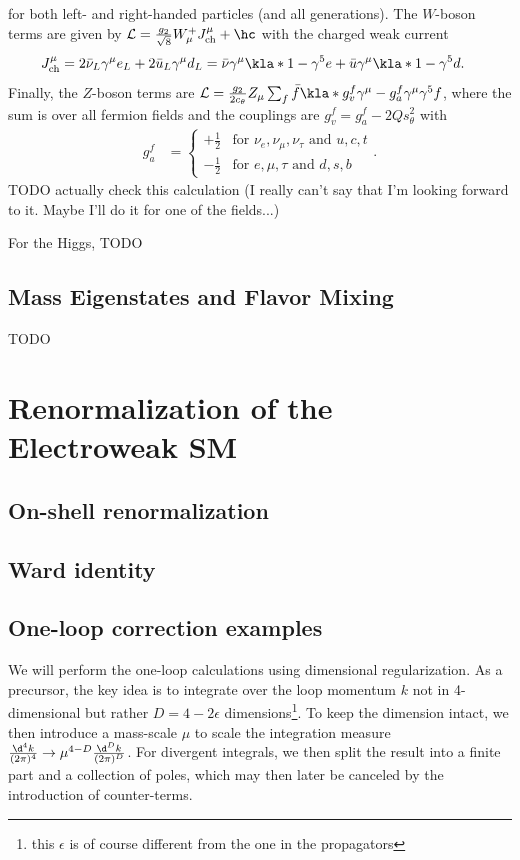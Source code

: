 \documentclass[english, parskip=full]{scrbook}
\begin{document}
for both left- and right-handed particles (and all generations).
The $W$-boson terms are given by $\mathcal{L} = \frac{g_2}{\sqrt{8}} W_\mu^+ J_\text{ch}^\mu + \hc$ with the charged weak current
\begin{align}
J_\text{ch}^\mu &= 2\bar{\nu}_{L} \gamma^\mu e_L + 2\bar{u}_L\gamma^\mu d_L = \bar{\nu} \gamma^\mu \kla*{1-\gamma^5} e + \bar{u} \gamma^\mu \kla*{1-\gamma^5} d.
\end{align}
Finally, the $Z$-boson terms are $\mathcal{L} = \frac{g_2}{2c_\theta} Z_\mu \sum_f \bar{f} \kla*{g^f_v \gamma^\mu - g^f_a \gamma^\mu \gamma^5}f$, where the sum is over all fermion fields and the couplings are $g^f_v = g^f_a - 2Qs_\theta^2$ with
\begin{align}
g^f_a &= \begin{cases} +\frac{1}{2} & \text{for }\nu_e,\nu_\mu,\nu_\tau \text{ and } u,c,t \\ -\frac{1}{2} & \text{for }e,\mu,\tau \text{ and } d,s,b \end{cases}.
\end{align}
TODO actually check this calculation (I really can't say that I'm looking forward to it. Maybe I'll do it for one of the fields...)

For the Higgs, TODO

\section{Mass Eigenstates and Flavor Mixing}
TODO

\chapter{Renormalization of the Electroweak SM}
\section{On-shell renormalization}
\section{Ward identity}
\section{One-loop correction examples}
We will perform the one-loop calculations using dimensional regularization.
As a precursor, the key idea is to integrate over the loop momentum $k$ not in 4-dimensional but rather $D=4-2\epsilon$ dimensions\footnote{this $\epsilon$ is of course different from the one in the propagators}.
To keep the dimension intact, we then introduce a mass-scale $\mu$ to scale the integration measure $\frac{\d^4k}{(2\pi)^4} \rightarrow \mu^{4-D}\frac{\d^Dk}{(2\pi)^D}$.
For divergent integrals, we then split the result into a finite part and a collection of poles, which may then later be canceled by the introduction of counter-terms.
\end{document}
